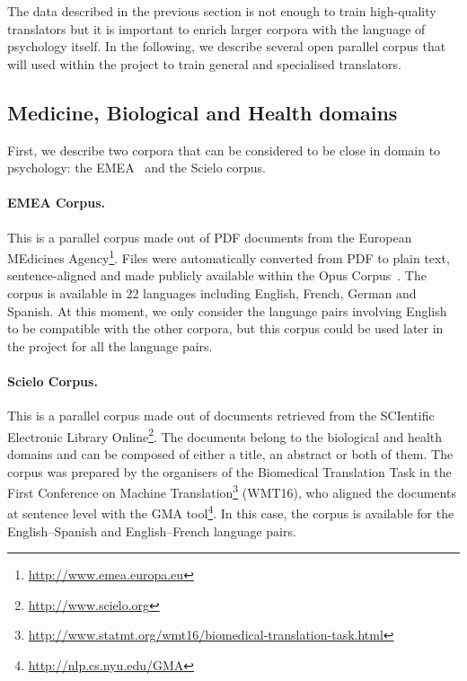 \documentclass[a4paper,11pt]{article}
\begin{document}
The data described in the previous section is not enough to train high-quality translators but it is important to enrich larger corpora with the language of psychology itself. In the following, we describe several open parallel corpus that will used within the project to train general and specialised translators.

\subsection{Medicine, Biological and Health domains}

First, we describe two corpora that can be considered to be close in domain to psychology: the EMEA~\cite{tiedemann:2009} and the Scielo corpus.

\paragraph{EMEA Corpus.}
This is a parallel corpus made out of PDF documents from the European MEdicines Agency\footnote{\url{http://www.emea.europa.eu}}. Files were automatically converted from PDF to plain text, sentence-aligned and made publicly available within the Opus Corpus~\cite{tiedemann:2009}. The corpus is available in 22 languages including English, French, German and Spanish. At this moment, we only consider the language pairs involving English to be compatible with the other corpora, but this corpus could be used later in the project for all the language pairs.

\paragraph{Scielo Corpus.}
This is a parallel corpus made out of documents retrieved from the SCIentific Electronic Library Online\footnote{\url{http://www.scielo.org}}. The documents belong to the biological and health domains and can be composed of either a title, an abstract or both of them. The corpus was prepared by the organisers of the Biomedical Translation Task in the First Conference on Machine Translation\footnote{\url{http://www.statmt.org/wmt16/biomedical-translation-task.html}} (WMT16), who aligned the documents at sentence level with the GMA tool\footnote{\url{http://nlp.cs.nyu.edu/GMA}}. In this case, the corpus is available for the English--Spanish and English--French language pairs.
\end{document}
